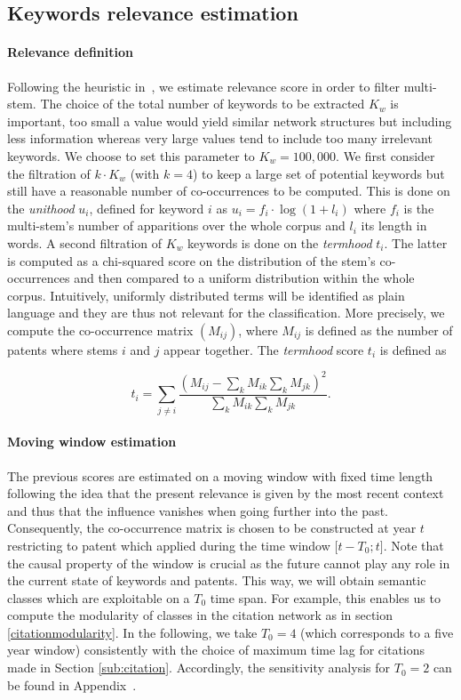 \documentclass[12pt,twoside,a4paper]{article}
\begin{document}
\subsection{Keywords relevance estimation}
\label{keywords_est}
\paragraph*{Relevance definition}

Following the heuristic in~\cite{chavalarias2013phylomemetic}, we estimate relevance score in order to filter multi-stem. The choice of the total number of keywords to be extracted $K_w$ is important, too small a value would yield similar network structures but including less information whereas very large values tend to include too many irrelevant keywords. We choose to set this parameter to $K_w = 100,000$. We first consider the filtration of $k\cdot K_w$ (with $k=4$) to keep a large set of potential keywords but still have a reasonable number of co-occurrences to be computed. This is done on the \emph{unithood} $u_i$, defined for keyword $i$ as $u_i = f_i\cdot \log{(1 + l_i)}$ where $f_i$ is the multi-stem's number of apparitions over the whole corpus and $l_i$ its length in words. A second filtration of $K_w$ keywords is done on the \emph{termhood} $t_i$. The latter is computed as a chi-squared score on the distribution of the stem's co-occurrences and then compared to a uniform distribution within the whole corpus. Intuitively, uniformly distributed terms will be identified as plain language and they are thus not relevant for the classification. More precisely, we compute the co-occurrence matrix $(M_{ij})$, where $M_{ij}$ is defined as the number of patents where stems $i$ and $j$ appear together. The \emph{termhood} score $t_i$ is defined as

\[
t_i = \sum_{j\neq i}\frac{\left( M_{ij} - \sum_{k}M_{ik} \sum_{k} M_{jk}\right)^2}{\sum_{k}M_{ik} \sum_{k} M_{jk}}.
\]

\paragraph*{Moving window estimation}
The previous scores are estimated on a moving window with fixed time length following the idea that the present relevance is given by the most recent context and thus that the influence vanishes when going further into the past. Consequently, the co-occurrence matrix is chosen to be constructed at year $t$ restricting to patent which applied during the time window $\big[ t - T_0 ; t \big]$. Note that the causal property of the window is crucial as the future cannot play any role in the current state of keywords and patents. This way, we will obtain semantic classes which are exploitable on a $T_0$ time span. For example, this enables us to compute the modularity of classes in the citation network as in section \ref{citationmodularity}. In the following, we take $T_0 = 4$ (which corresponds to a five year window) consistently with the choice of maximum time lag for citations made in Section \ref{sub:citation}. Accordingly, the sensitivity analysis for $T_0=2$ can be found in Appendix~.
\end{document}
